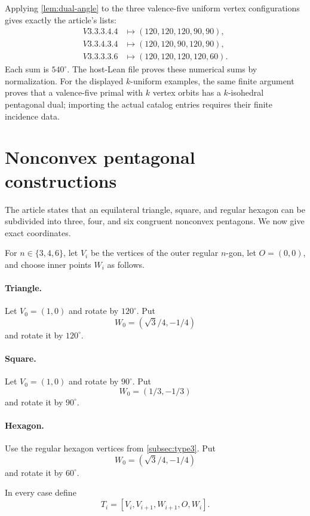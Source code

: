 \documentclass[11pt]{article}
\theoremstyle{remark}
\begin{document}
Applying \cref{lem:dual-angle} to the three valence-five uniform vertex
configurations gives exactly the article's lists:
\begin{align*}
 V3.3.3.4.4&\longmapsto(120,120,120,90,90),\\
 V3.3.4.3.4&\longmapsto(120,120,90,120,90),\\
 V3.3.3.3.6&\longmapsto(120,120,120,120,60).
\end{align*}
Each sum is \(540^\circ\).  The host-Lean file proves these numerical sums by
normalization.  For the displayed \(k\)-uniform examples, the same finite
argument proves that a valence-five primal with \(k\) vertex orbits has a
\(k\)-isohedral pentagonal dual; importing the actual catalog entries requires
their finite incidence data.

\section{Nonconvex pentagonal constructions}
\label{sec:nonconvex}

The article states that an equilateral triangle, square, and regular hexagon
can be subdivided into three, four, and six congruent nonconvex pentagons.  We
now give exact coordinates.

For \(n\in\{3,4,6\}\), let \(V_i\) be the vertices of the outer regular
\(n\)-gon, let \(O=(0,0)\), and choose inner points \(W_i\) as follows.

\paragraph{Triangle.}
Let \(V_0=(1,0)\) and rotate by \(120^\circ\).  Put
\[
 W_0=(\sqrt3/4,-1/4)
\]
and rotate it by \(120^\circ\).

\paragraph{Square.}
Let \(V_0=(1,0)\) and rotate by \(90^\circ\).  Put
\[
 W_0=(1/3,-1/3)
\]
and rotate it by \(90^\circ\).

\paragraph{Hexagon.}
Use the regular hexagon vertices from \cref{subsec:type3}.  Put
\[
 W_0=(\sqrt3/4,-1/4)
\]
and rotate it by \(60^\circ\).

In every case define
\[
 T_i=[V_i,V_{i+1},W_{i+1},O,W_i].
\]
\end{document}
